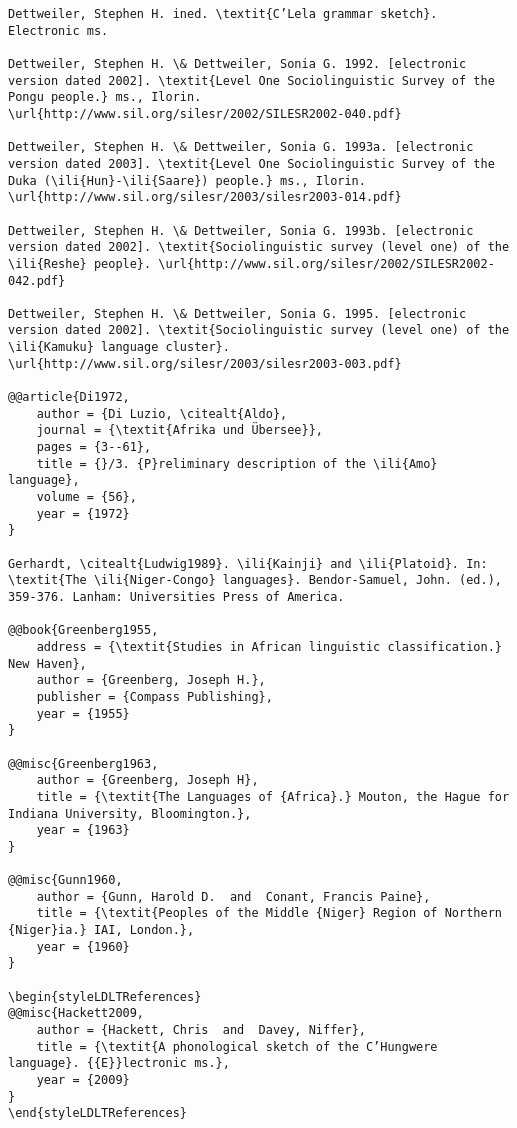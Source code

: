 \documentclass[output=paper]{langsci/langscibook}
\begin{document}
\begin{verbatim}
Dettweiler, Stephen H. ined. \textit{C’Lela grammar sketch}. Electronic ms.

Dettweiler, Stephen H. \& Dettweiler, Sonia G. 1992. [electronic version dated 2002]. \textit{Level One Sociolinguistic Survey of the Pongu people.} ms., Ilorin. \url{http://www.sil.org/silesr/2002/SILESR2002-040.pdf}

Dettweiler, Stephen H. \& Dettweiler, Sonia G. 1993a. [electronic version dated 2003]. \textit{Level One Sociolinguistic Survey of the Duka (\ili{Hun}-\ili{Saare}) people.} ms., Ilorin. \url{http://www.sil.org/silesr/2003/silesr2003-014.pdf}

Dettweiler, Stephen H. \& Dettweiler, Sonia G. 1993b. [electronic version dated 2002]. \textit{Sociolinguistic survey (level one) of the \ili{Reshe} people}. \url{http://www.sil.org/silesr/2002/SILESR2002-042.pdf}

Dettweiler, Stephen H. \& Dettweiler, Sonia G. 1995. [electronic version dated 2002]. \textit{Sociolinguistic survey (level one) of the \ili{Kamuku} language cluster}. \url{http://www.sil.org/silesr/2003/silesr2003-003.pdf}

@@article{Di1972,
	author = {Di Luzio, \citealt{Aldo},
	journal = {\textit{Afrika und Übersee}},
	pages = {3--61},
	title = {}/3. {P}reliminary description of the \ili{Amo} language},
	volume = {56},
	year = {1972}
}

Gerhardt, \citealt{Ludwig1989}. \ili{Kainji} and \ili{Platoid}. In: \textit{The \ili{Niger-Congo} languages}. Bendor-Samuel, John. (ed.), 359-376. Lanham: Universities Press of America.

@@book{Greenberg1955,
	address = {\textit{Studies in African linguistic classification.} New Haven},
	author = {Greenberg, Joseph H.},
	publisher = {Compass Publishing},
	year = {1955}
}

@@misc{Greenberg1963,
	author = {Greenberg, Joseph H},
	title = {\textit{The Languages of {Africa}.} Mouton, the Hague for Indiana University, Bloomington.},
	year = {1963}
}

@@misc{Gunn1960,
	author = {Gunn, Harold D.  and  Conant, Francis Paine},
	title = {\textit{Peoples of the Middle {Niger} Region of Northern {Niger}ia.} IAI, London.},
	year = {1960}
}

\begin{styleLDLTReferences}
@@misc{Hackett2009,
	author = {Hackett, Chris  and  Davey, Niffer},
	title = {\textit{A phonological sketch of the C’Hungwere  language}. {{E}}lectronic ms.},
	year = {2009}
}
\end{styleLDLTReferences}


\end{verbatim}
\end{document}
